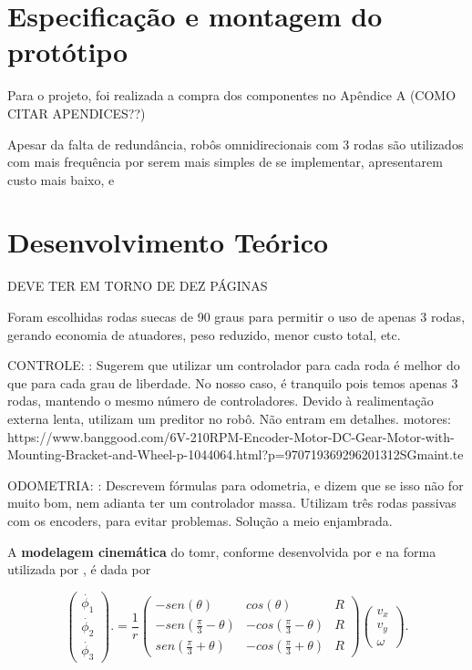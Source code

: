 \section{Especificação e montagem do protótipo}
\label{sec:montagem}

Para o projeto, foi realizada a compra dos componentes no Apêndice A (COMO CITAR APENDICES??)

Apesar da falta de redundância, robôs omnidirecionais com 3 rodas são utilizados com mais frequência por serem mais simples de se implementar, apresentarem custo mais baixo, e

\section{Desenvolvimento Teórico}
\label{sec:teorico}

DEVE TER EM TORNO DE DEZ PÁGINAS

Foram escolhidas rodas suecas de 90 graus para permitir o uso de apenas 3 rodas, gerando economia de atuadores, peso reduzido, menor custo total, etc.

 CONTROLE:
 \cite{rojas2006holonomic}: Sugerem que utilizar um controlador para cada roda é melhor do que para cada grau de liberdade. No nosso caso, é tranquilo pois temos apenas 3 rodas, mantendo o mesmo número de controladores. Devido à realimentação externa lenta, utilizam um preditor no robô. Não entram em detalhes.
motores:
https://www.banggood.com/6V-210RPM-Encoder-Motor-DC-Gear-Motor-with-Mounting-Bracket-and-Wheel-p-1044064.html?p=970719369296201312SGmaint.te

ODOMETRIA:
\cite{samani2007comprehensive}: Descrevem fórmulas para odometria, e dizem que se isso não for muito bom, nem adianta ter um controlador massa. Utilizam três rodas passivas com os encoders, para evitar problemas. Solução a meio enjambrada.

A \textbf{modelagem cinemática} do \acrshort{tomr}, conforme desenvolvida por \cite{campion1996structural} e na forma utilizada por \cite{samani2007comprehensive}, é dada por

\begin{equation}
  \begin{pmatrix}
    \dot{\phi_1} \\
    \dot{\phi_2} \\
    \dot{\phi_3}
  \end{pmatrix}.
  =
  \frac{1}{r}
  \begin{pmatrix}
    -sen(\theta)               & cos(\theta)                & R \\
    -sen(\frac{\pi}{3}-\theta) & -cos(\frac{\pi}{3}-\theta) & R \\
    sen(\frac{\pi}{3}+\theta)  & -cos(\frac{\pi}{3}+\theta) & R
  \end{pmatrix}
  \begin{pmatrix}
    v_x \\
    v_y \\
    \omega
  \end{pmatrix}.
  \label{eq:pkm}
\end{equation}


